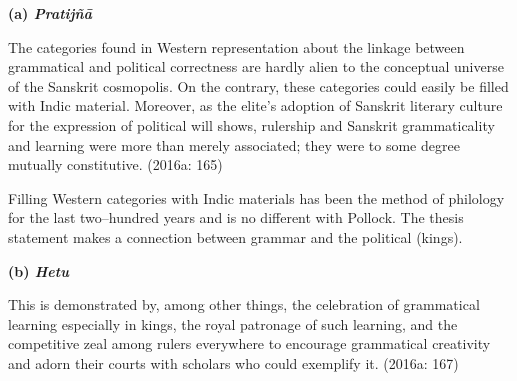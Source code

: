 \textbf{(a) \textit{Pratijñā }}

\begin{myquote}
The categories found in Western representation about the linkage between grammatical and political correctness are hardly alien to the conceptual universe of the Sanskrit cosmopolis. On the contrary, these categories could easily be ﬁlled with Indic material. Moreover, as the elite’s adoption of Sanskrit literary culture for the expression of political will shows, rulership and Sanskrit grammaticality and learning were more than merely associated; they were to some degree mutually constitutive. (2016a: 165)
\end{myquote}

Filling Western categories with Indic materials has been the method of philology for the last two–hundred years and is no different with Pollock. The thesis statement makes a connection between grammar and the political (kings).

\textbf{(b) \textit{Hetu}}

\begin{myquote}
This is demonstrated by, among other things, the celebration of grammatical learning especially in kings, the royal patronage of such learning, and the competitive zeal among rulers everywhere to encourage grammatical creativity and adorn their courts with scholars who could exemplify it. (2016a: 167)
\end{myquote}

